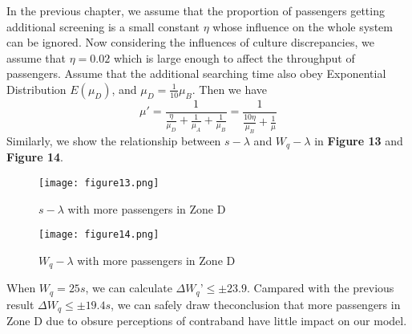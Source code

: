 \documentclass{mcmthesis}
\begin{document}
In the previous chapter, we assume that the proportion of passengers getting additional screening is a small constant $\eta$ whose influence on the whole system can be ignored. Now considering the influences of culture discrepancies, we assume that $\eta=0.02$ which is large enough to affect the throughput of passengers. Assume that the additional searching time also obey Exponential Distribution $E(\mu_D)$, and $\mu_D=\frac{1}{10}\mu_B$.
Then we have
$$\mu'=\frac{1}{\frac{\eta}{\mu_D}+\frac{1}{\mu_A}+\frac{1}{\mu_B}}=\frac{1}{\frac{10\eta}{\mu_B}+\frac{1}{\mu}}$$
Similarly, we show the relationship between $s-\lambda$ and $W_q-\lambda$ in \textbf{Figure 13} and \textbf{Figure 14}.
\begin{figure}[H]
\small
\centering
\texttt{[image: figure13.png]}
\caption{$s-\lambda$ with more passengers in Zone D} \label{fig:13}
\end{figure}
\begin{figure}[H]
\small
\centering
\texttt{[image: figure14.png]}
\caption{$W_q-\lambda$ with more passengers in Zone D} \label{fig:14}
\end{figure}
When $W_q=25s$, we can calculate $\Delta W_q’\leq\pm23.9$. Campared with the previous result $\Delta W_q\leq \pm 19.4s$, we can safely draw theconclusion that more passengers in Zone D due to obsure perceptions of contraband have little impact on our model.
\end{document}
